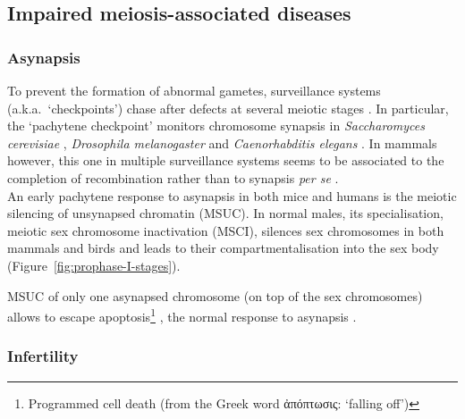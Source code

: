 \subsection{Impaired meiosis-associated diseases}

\subsubsection{Asynapsis}
To prevent the formation of abnormal gametes, surveillance systems (a.k.a.\ ‘checkpoints’) chase after defects at several meiotic stages \citep[reviewed in][]{handel2010genetics}.
In particular, the ‘pachytene checkpoint’ \citep{roeder2000pachytene} monitors chromosome synapsis in \textit{Saccharomyces cerevisiae} \citep{wu2006two}, \textit{Drosophila melanogaster} \citep{ghabrial1999activation,abdu2002activation} and \textit{Caenorhabditis elegans} \citep{bhalla2005conserved}.
In mammals however, this one in multiple surveillance systems \citep{barchi2005surveillance} seems to be associated to the completion of recombination rather than to synapsis \textit{per se} \citep{li2007mouse}.\\

An early pachytene response to asynapsis in both mice \citep{baarends2005silencing,turner2005silencing} and humans \citep{ferguson2008silencing,sciurano2007asynaptic} is the meiotic silencing of unsynapsed chromatin (MSUC). 
In normal males, its specialisation, meiotic sex chromosome inactivation (MSCI), silences sex chromosomes in both mammals and birds \citep{schoenmakers2009female} and leads to their compartmentalisation into the sex body (Figure~\ref{fig:prophase-I-stages}).

MSUC of only one asynapsed chromosome (on top of the sex chromosomes) allows to escape apoptosis\footnote{Programmed cell death (from the Greek word \textgreek{ἀπόπτωσις}: ‘falling off’)} \citep{mahadevaiah2008extensive,jaramillo-lambert2010single}, the normal response to asynapsis \citep{hochwagen2006checking}.


\subsubsection{Infertility}

